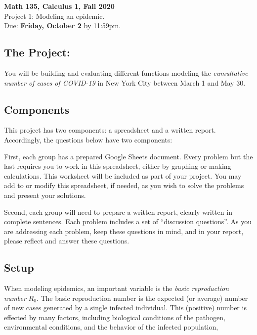 \documentclass[11pt,reqno,final]{amsart}
\numberwithin{equation}{section}
\numberwithin{figure}{section}
\theoremstyle{definition} %
\begin{document}
\onehalfspacing

\begin{center}
        \textbf{\Large Math 135, Calculus 1, Fall 2020}\\[10pt]
        {\large Project 1: Modeling an epidemic.}\\
        Due: \textbf{Friday, October 2} by 11:59pm.
\end{center}

\thispagestyle{empty}

\renewcommand{\thesection}{\Alph{section}}

\subsection*{The Project:}
You will be building and evaluating different functions modeling the \textit{cumultative number of cases of COVID-19} in New York City between March 1 and May 30.


\subsection*{Components}

This project has two components: a spreadsheet and a written report.
Accordingly, the questions below have two components:

First, each group has a prepared Google Sheets document.
Every problem but the last requires you to work in this spreadsheet, either by graphing or making calculations.
This worksheet will be included as part of your project.
You may add to or modify this spreadsheet, if needed, as you wish to solve the problems and present your solutions.

Second, each group will need to prepare a written report, clearly written in complete sentences.
Each problem includes a set of ``discussion questions''.
As you are addressing each problem, keep these questions in mind, and in your report, please reflect and answer these questions.


\subsection*{Setup}
When modeling epidemics, an important variable is the \textit{basic reproduction number} $R_0$.
The basic reproduction number is the expected (or average) number of new cases generated by a single infected individual.
This (positive) number is effected by many factors, including
biological conditions of the pathogen, environmental conditions, and the behavior of the infected population, 
\end{document}

